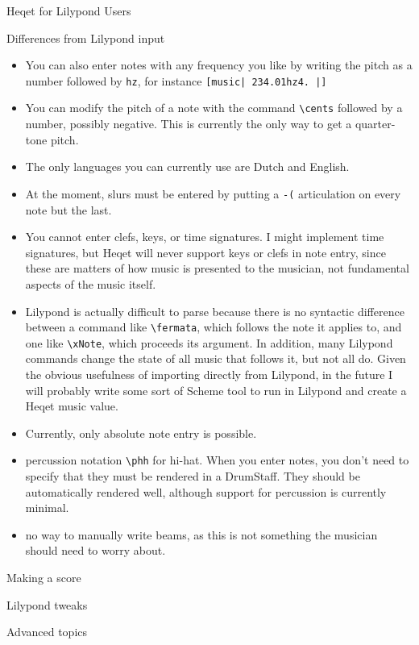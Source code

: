 \documentclass{article}
\begin{document}
\begin{section}{Heqet for Lilypond Users}
\begin{subsection}{Differences from Lilypond input}
\begin{itemize}
\item You can also enter notes with any frequency you like by writing the pitch as a number followed by  \verb+hz+, for instance \verb+[music| 234.01hz4. |]+

\item You can modify the pitch of a note with the command \verb+\cents+ followed by a number, possibly negative. This is currently the only way to get a quarter-tone pitch.

\item The only languages you can currently use are Dutch and English. 

\item At the moment, slurs must be entered by putting a \verb+-(+ articulation on every note but the last.

\item You cannot enter clefs, keys, or time signatures. I might implement time signatures, but Heqet will never support keys or clefs in note entry, since these are matters of how music is presented to the musician, not fundamental aspects of the music itself.

\item Lilypond is actually difficult to parse because there is no syntactic difference between a command like \verb+\fermata+, which follows the note it applies to, and one like \verb+\xNote+, which proceeds its argument. In addition, many Lilypond commands change the state of all music that follows it, but not all do. Given the obvious usefulness of importing directly from Lilypond, in the future I will probably write some sort of Scheme tool to run in Lilypond and create a Heqet music value.

\item Currently, only absolute note entry is possible.

\item percussion notation \verb+\phh+ for hi-hat. When you enter notes, you don't need to specify that they must be rendered in a DrumStaff. They should be automatically rendered well, although support for percussion is currently minimal.

\item no way to manually write beams, as this is not something the musician should need to worry about.
\end{itemize}
\end{subsection}

\begin{subsection}{Making a score}

\end{subsection}

\begin{subsection}{Lilypond tweaks}

\end{subsection}

\end{section}

\begin{section}{Advanced topics}

\end{section}
\end{document}
